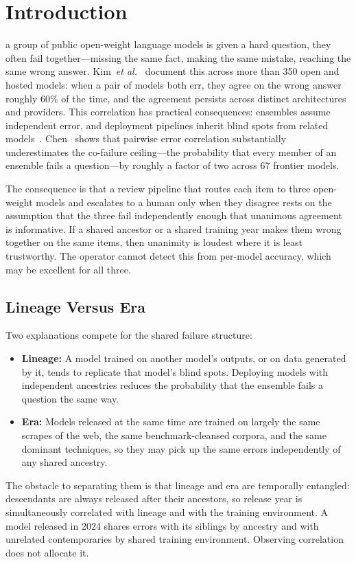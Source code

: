 \documentclass{ieeeaccess}
\theoremstyle{definition}
\theoremstyle{plain}
\begin{document}
\titlepgskip=-21pt

\maketitle

\section{Introduction}
\label{sec:introduction}

 a group of public open-weight language models is given a hard question, they often fail together---missing the same fact, making the same mistake, reaching the same wrong answer. Kim~\textit{et al.}~\cite{kim2025} document this across more than 350 open and hosted models: when a pair of models both err, they agree on the wrong answer roughly 60\% of the time, and the agreement persists across distinct architectures and providers. This correlation has practical consequences: ensembles assume independent error, and deployment pipelines inherit blind spots from related models~\cite{li2026roots}. Chen~\cite{chen2026} shows that pairwise error correlation substantially underestimates the co-failure ceiling---the probability that every member of an ensemble fails a question---by roughly a factor of two across 67 frontier models.

The consequence is that a review pipeline that routes each item to three open-weight models and escalates to a human only when they disagree rests on the assumption that the three fail independently enough that unanimous agreement is informative. If a shared ancestor or a shared training year makes them wrong together on the same items, then unanimity is loudest where it is least trustworthy. The operator cannot detect this from per-model accuracy, which may be excellent for all three.

\subsection{Lineage Versus Era}
Two explanations compete for the shared failure structure:
\begin{itemize}
\item \textbf{Lineage:} A model trained on another model's outputs, or on data generated by it, tends to replicate that model's blind spots. Deploying models with independent ancestries reduces the probability that the ensemble fails a question the same way.
\item \textbf{Era:} Models released at the same time are trained on largely the same scrapes of the web, the same benchmark-cleansed corpora, and the same dominant techniques, so they may pick up the same errors independently of any shared ancestry.
\end{itemize}
The obstacle to separating them is that lineage and era are temporally entangled: descendants are always released after their ancestors, so release year is simultaneously correlated with lineage and with the training environment. A model released in 2024 shares errors with its siblings by ancestry and with unrelated contemporaries by shared training environment. Observing correlation does not allocate it.
\end{document}
